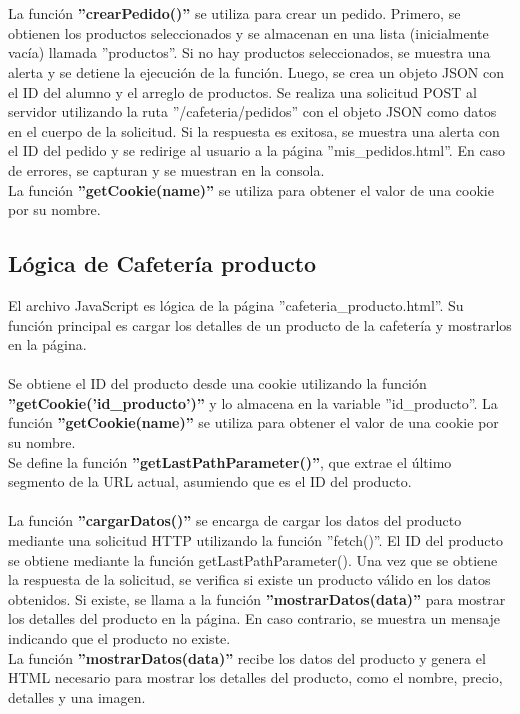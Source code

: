 \documentclass[12pt]{report}
\begin{document}
\\\\
La función \textbf{''crearPedido()''} se utiliza para crear un pedido. Primero, se obtienen los productos seleccionados y se almacenan en una lista (inicialmente vacía) llamada ''productos''. Si no hay productos seleccionados, se muestra una alerta y se detiene la ejecución de la función. Luego, se crea un objeto JSON con el ID del alumno y el arreglo de productos. Se realiza una solicitud POST al servidor utilizando la ruta ''/cafeteria/pedidos'' con el objeto JSON como datos en el cuerpo de la solicitud. Si la respuesta es exitosa, se muestra una alerta con el ID del pedido y se redirige al usuario a la página ''mis\_pedidos.html''. En caso de errores, se capturan y se muestran en la consola.
\\
La función \textbf{''getCookie(name)''} se utiliza para obtener el valor de una cookie por su nombre. 
\subsection{Lógica de Cafetería producto}
El archivo JavaScript es lógica de la página ''cafeteria\_producto.html''. Su función principal es cargar los detalles de un producto de la cafetería y mostrarlos en la página.\\\\
Se obtiene el ID del producto desde una cookie utilizando la función \textbf{''getCookie('id\_producto')''} y lo almacena en la variable ''id\_producto''.
La función \textbf{''getCookie(name)''} se utiliza para obtener el valor de una cookie por su nombre. \\
Se define la función \textbf{''getLastPathParameter()''}, que extrae el último segmento de la URL actual, asumiendo que es el ID del producto.\\\\
La función \textbf{''cargarDatos()''} se encarga de cargar los datos del producto mediante una solicitud HTTP utilizando la función ''fetch()''. El ID del producto se obtiene mediante la función getLastPathParameter().
Una vez que se obtiene la respuesta de la solicitud, se verifica si existe un producto válido en los datos obtenidos. Si existe, se llama a la función \textbf{''mostrarDatos(data)''} para mostrar los detalles del producto en la página. En caso contrario, se muestra un mensaje indicando que el producto no existe.\\
La función \textbf{''mostrarDatos(data)''} recibe los datos del producto y genera el HTML necesario para mostrar los detalles del producto, como el nombre, precio, detalles y una imagen.
\end{document}
